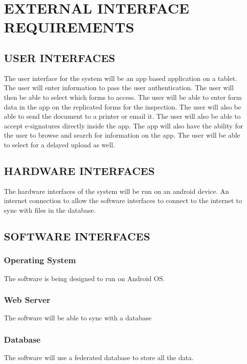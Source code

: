 \documentclass[twoside,letterpaper]{article}
\begin{document}
\clearpage\section[EXTERNAL INTERFACE
REQUIREMENTS]{\rmfamily\bfseries\color{black}
EXTERNAL INTERFACE
REQUIREMENTS}

\subsection[USER INTERFACES]{\rmfamily\bfseries\color{black}
USER INTERFACES}
{\rmfamily\color{black}
The user interface for the system will be an app based application on a tablet. The user will enter information to pass the user authentication. The user will then be able to select which forms to access. The user will be able to enter form data in the app on the replicated forms for the inspection. The user will also be able to send the document to a printer or email it. The user will also be able to accept e-signatures directly inside the app. The app will also have the ability for the user to browse and search for information on the app. The user will be able to select for a delayed upload as well.}

\subsection[HARDWARE INTERFACES]{\rmfamily\bfseries\color{black}
HARDWARE INTERFACES}
{\rmfamily\color{black}
	The hardware interfaces of the system will be run on an android device. An internet connection to allow the software interfaces to connect to the internet to sync with files in the database. }

\subsection[SOFTWARE INTERFACES]{\rmfamily\bfseries\color{black}
SOFTWARE INTERFACES}
{\rmfamily\color{black}
\subsubsection{Operating System} 
The software is being designed to run on Android OS.
\subsubsection{Web Server}
The software will be able to sync with a database
\subsubsection{Database}
The software will use a federated database to store all the data.}
\end{document}
